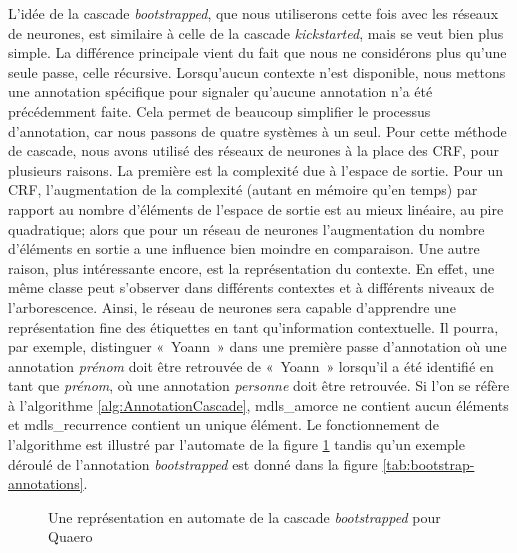 \documentclass[PhD-Yoann-Dupont.tex]{subfiles}
\begin{document}
L'idée de la cascade \textit{bootstrapped}, que nous utiliserons cette fois avec les réseaux de neurones, est similaire à celle de la cascade \textit{kickstarted}, mais se veut bien plus simple. La différence principale vient du fait que nous ne considérons plus qu'une seule passe, celle récursive. Lorsqu'aucun contexte n'est disponible, nous mettons une annotation spécifique pour signaler qu'aucune annotation n'a été précédemment faite. Cela permet de beaucoup simplifier le processus d'annotation, car nous passons de quatre systèmes à un seul.
Pour cette méthode de cascade, nous avons utilisé des réseaux de neurones à la place des CRF, pour plusieurs raisons. La première est la complexité due à l'espace de sortie. Pour un CRF, l'augmentation de la complexité (autant en mémoire qu'en temps) par rapport au nombre d'éléments de l'espace de sortie est au mieux linéaire, au pire quadratique; alors que pour un réseau de neurones l'augmentation du nombre d'éléments en sortie a une influence bien moindre en comparaison. Une autre raison, plus intéressante encore, est la représentation du contexte. En effet, une même classe peut s'observer dans différents contextes et à différents niveaux de l'arborescence. Ainsi, le réseau de neurones sera capable d'apprendre une représentation fine des étiquettes en tant qu'information contextuelle. Il pourra, par exemple, distinguer «\ Yoann\ » dans une première passe d'annotation où une annotation \emph{prénom} doit être retrouvée de «\ Yoann\ » lorsqu'il a été identifié en tant que \emph{prénom}, où une annotation \emph{personne} doit être retrouvée. Si l'on se réfère à l'algorithme \ref{alg:AnnotationCascade}, mdls\_amorce ne contient aucun éléments et mdls\_recurrence contient un unique élément. Le fonctionnement de l'algorithme est illustré par l'automate de la figure \ref{fig:bootstrap-automaton} tandis qu'un exemple déroulé de l'annotation \textit{bootstrapped} est donné dans la figure \ref{tab:bootstrap-annotations}.

\begin{figure}[ht!]
\centering
{}
\caption{Une représentation en automate de la cascade \textit{bootstrapped} pour Quaero}
\label{fig:bootstrap-automaton}
\end{figure}
\end{document}
